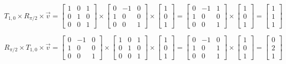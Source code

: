 \documentclass{book}
\begin{document}
\begin{equation*}
T_{1,0} \times R_{\pi/2} \times \vec{v} = 
\begin{bmatrix}1 & 0 & 1 \\ 0 & 1 & 0 \\ 0 & 0 & 1\end{bmatrix} \times
\begin{bmatrix}0 & -1 & 0 \\ 1 & 0 & 0 \\ 0 & 0 & 1\end{bmatrix} \times
\begin{bmatrix}1 \\ 0 \\ 1\end{bmatrix} = 
\begin{bmatrix}0 & -1 & 1 \\ 1 & 0 & 0 \\ 0 & 0 & 1\end{bmatrix} \times
\begin{bmatrix}1 \\ 0 \\ 1\end{bmatrix} =
\begin{bmatrix}1 \\ 1 \\ 1\end{bmatrix}
\end{equation*}

\begin{equation*}
R_{\pi/2} \times T_{1,0} \times \vec{v} = 
\begin{bmatrix}0 & -1 & 0 \\ 1 & 0 & 0 \\ 0 & 0 & 1\end{bmatrix} \times
\begin{bmatrix}1 & 0 & 1 \\ 0 & 1 & 0 \\ 0 & 0 & 1\end{bmatrix} \times
\begin{bmatrix}1 \\ 0 \\ 1\end{bmatrix} = 
\begin{bmatrix}0 & -1 & 0 \\ 1 & 0 & 1 \\ 0 & 0 & 1\end{bmatrix} \times
\begin{bmatrix}1 \\ 0 \\ 1\end{bmatrix} =
\begin{bmatrix}0 \\ 2 \\ 1\end{bmatrix}
\end{equation*}
\end{document}
